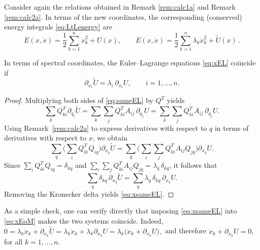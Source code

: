 \documentclass{rendiconti}
\begin{document}
\begin{remark} Consider again the relations obtained in Remark \ref{rem:calc1a} and Remark \ref{rem:calc2a}. In terms of the new coordinates, the corresponding (conserved) energy integrals \eqref{eq:LtLenergy} are
\begin{equation}
\label{eq:energies}
E(x,\dot{x})=\frac{1}{2} \sum_{k=1}^n \dot{x}_k^2+U(x),
\quad\quad
E(x,\dot{x})=\frac{1}{2} \sum_{k=1}^n \lambda_k \dot{x}_k^2+\widetilde U(x)\,.
\end{equation}
\end{remark}
%
\begin{proposition}
In terms of spectral coordinates, the Euler--Lagrange equations \eqref{eq:xEL} coincide if
\begin{equation}
\label{eq:xsameEL}
\partial_{x_i} \widetilde U
=
\lambda_i\, \partial_{x_i} U,
\qquad i=1,\dots,n.
\end{equation}
\end{proposition}

\begin{proof}
Multiplying both sides of \eqref{eq:sameEL} by $Q^T$ yields
\begin{equation}
\textstyle
\sum_{k}Q^T_{ki}\partial_{q_i} \widetilde U = \sum_{k} \sum_{j}Q^T_{ki}A_{ij} \, \partial_{q_j} U=\sum_{k} \sum_{j}Q^T_{ki}A_{ij} \, \partial_{q_j} U.
\end{equation}
Using Remark~\ref{rem:calc2a} to express derivatives with respect to $q$ in terms
of derivatives with respect to $x$, we obtain
\begin{equation}
\textstyle
\sum_q
\Big(\sum_i Q^T_{ki} Q_{iq}\Big)\partial_{x_q} \widetilde U
=
\sum_q
\Big(\sum_i \sum_j Q^T_{ki} A_{ij} Q_{jq}\Big)\partial_{x_q} U.
\end{equation}
Since
$\sum_i Q^T_{ki} Q_{iq}=\delta_{kq}$ and
$\sum_i \sum_j Q^T_{ki} A_{ij} Q_{jq}=\lambda_q\,\delta_{kq}$,
it follows that
\begin{equation}
\textstyle
\sum_q \delta_{kq}\,\partial_{x_q} \widetilde U
=
\sum_q \lambda_q\,\delta_{kq}\,\partial_{x_q} U.
\end{equation}
Removing the Kronecker delta yields \eqref{eq:xsameEL}.
\end{proof}



\begin{remark}
\label{rem:sameEoM}
As a simple check, one can verify directly that imposing
\eqref{eq:xsameEL} into \eqref{eq:xEoM} makes the two systems coincide. Indeed,
$
\textstyle
0
=
\lambda_k \ddot x_k + \partial_{x_k} \widetilde U
=
\lambda_k \ddot x_k + \lambda_k \partial_{x_k} U
=
\lambda_k \big(\ddot x_k + \partial_{x_k} U\big),
$
and therefore
$\ddot x_k + \partial_{x_k} U = 0$, for all $k=1,\dots,n$.
\end{remark}
\end{document}
